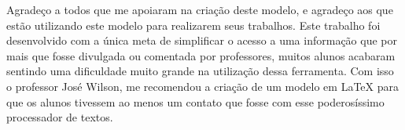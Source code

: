 
\begin{agradecimentos}
Agradeço a todos que me apoiaram na criação deste modelo, e agradeço aos que estão utilizando este modelo para realizarem seus trabalhos.
Este trabalho foi desenvolvido com a única meta de simplificar o acesso a uma informação que por mais que fosse divulgada ou comentada por professores, muitos alunos acabaram sentindo uma dificuldade muito grande na utilização dessa ferramenta. Com isso o professor José Wilson, me recomendou a criação de um modelo em LaTeX para que os alunos tivessem ao menos um contato que fosse com esse poderosíssimo processador de textos. 

\end{agradecimentos}
